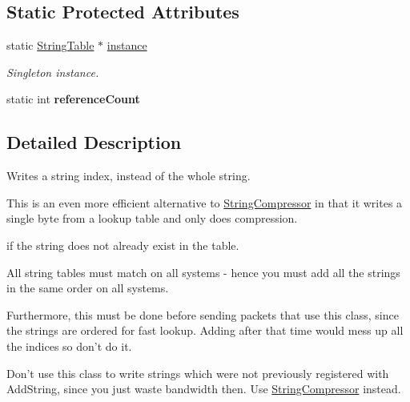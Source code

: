 \subsection*{Static Protected Attributes}
\begin{DoxyCompactItemize}
\item 
\hypertarget{class_rak_net_1_1_string_table_a1abd5e46239e1e0df0d6cf7d16e452b1}{static \hyperlink{class_rak_net_1_1_string_table}{String\-Table} $\ast$ \hyperlink{class_rak_net_1_1_string_table_a1abd5e46239e1e0df0d6cf7d16e452b1}{instance}}\label{class_rak_net_1_1_string_table_a1abd5e46239e1e0df0d6cf7d16e452b1}

\begin{DoxyCompactList}\small\item\em Singleton instance. \end{DoxyCompactList}\item 
\hypertarget{class_rak_net_1_1_string_table_a8d06ed198a1f574d5998370dd7540590}{static int {\bfseries reference\-Count}}\label{class_rak_net_1_1_string_table_a8d06ed198a1f574d5998370dd7540590}

\end{DoxyCompactItemize}


\subsection{Detailed Description}
Writes a string index, instead of the whole string. 

This is an even more efficient alternative to \hyperlink{class_rak_net_1_1_string_compressor}{String\-Compressor} in that it writes a single byte from a lookup table and only does compression.\par
 if the string does not already exist in the table.\par
 All string tables must match on all systems -\/ hence you must add all the strings in the same order on all systems.\par
 Furthermore, this must be done before sending packets that use this class, since the strings are ordered for fast lookup. Adding after that time would mess up all the indices so don't do it.\par
 Don't use this class to write strings which were not previously registered with Add\-String, since you just waste bandwidth then. Use \hyperlink{class_rak_net_1_1_string_compressor}{String\-Compressor} instead. 

